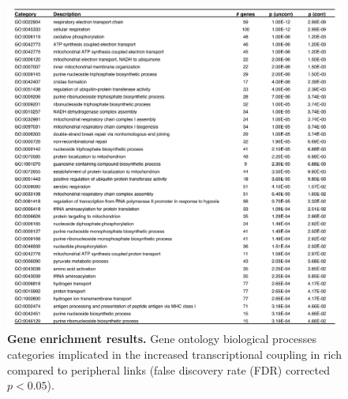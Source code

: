 \begin{figure}[h!]
\begin{center}
\includegraphics[width=1\textwidth]{Chapter5/SFigure14.pdf}%
\end{center}
\caption{\textbf{Gene enrichment results.} 
Gene ontology biological processes categories implicated in the increased transcriptional coupling in rich compared to peripheral links (false discovery rate (FDR) corrected $p<0.05$). }
\label{fig:Ch5SFig14}
\end{figure}

